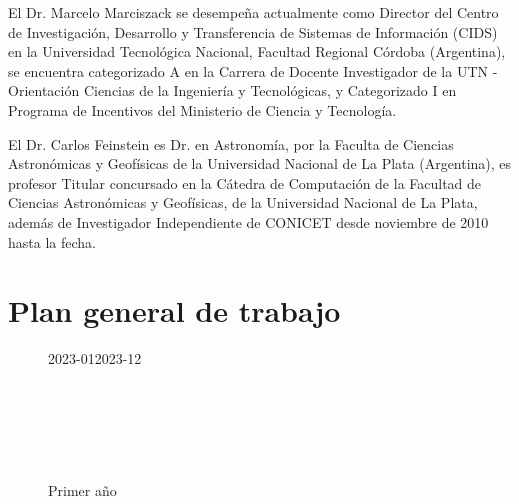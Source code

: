 \documentclass[
	11pt,oneside,a4paper,
	headsepline,footsepline,plainfootsepline,plainheadsepline,
	fleqn,
]{article}
\begin{document}
El Dr. Marcelo Marciszack se desempeña actualmente como Director del Centro de Investigación, Desarrollo y Transferencia de Sistemas de Información (CIDS) en la Universidad Tecnológica Nacional, Facultad Regional Córdoba (Argentina), se encuentra categorizado A en la Carrera de Docente Investigador de la UTN -
Orientación Ciencias de la Ingeniería y Tecnológicas, y Categorizado I
en Programa de Incentivos del Ministerio de Ciencia y Tecnología.

El Dr. Carlos Feinstein es Dr. en Astronomía, por la Faculta de Ciencias Astronómicas y Geofísicas de la Universidad Nacional de La Plata (Argentina), es profesor Titular concursado en la Cátedra de Computación de la Facultad de Ciencias Astronómicas y Geofísicas, de la Universidad Nacional de La Plata, además de Investigador Independiente de CONICET desde noviembre de 2010 hasta la fecha. 

\section{Plan general de trabajo}

\begin{figure}[H]
	\begin{ganttchart}[
			hgrid,
			vgrid,
			bar/.append style={draw=Black, fill=RoyalBlue!75},
			time slot format=isodate-yearmonth,
			time slot unit=month,
			newline shortcut=true,
			bar label node/.append style={align=right}
		]{2023-01}{2023-12}
		 \\
		 \\
		 \\
		\\
		\\
		\\
	\end{ganttchart}
	\caption*{Primer año}
\end{figure}
\end{document}
